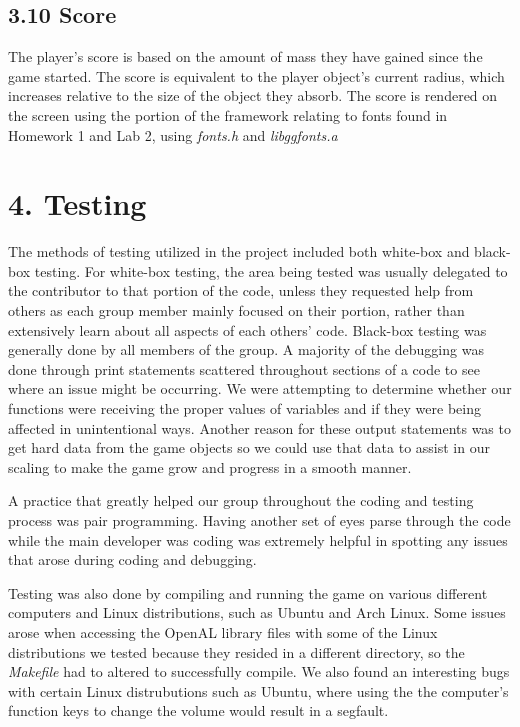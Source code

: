 \documentclass[12pt]{report}
\begin{document}
\newpage
\subsection*{3.10 Score}
The player's score is based on the amount of mass they have gained since the game started. The score is equivalent to the player object's current radius, which increases relative to the size of the object they absorb. The score is rendered on the screen using the portion of the framework relating to fonts found in Homework 1 and Lab 2, using \textit{fonts.h} and \textit{libggfonts.a} \bigskip

\newpage
\section*{4. Testing}

The methods of testing utilized in the project included both white-box and black-box testing. For white-box testing, the area being tested was usually delegated to the contributor to that portion of the code, unless they requested help from others as each group member mainly focused on their portion, rather than extensively learn about all aspects of each others' code. Black-box testing was generally done by all members of the group. A majority of the debugging was done through print statements scattered throughout sections of a code to see where an issue might be occurring. We were attempting to determine whether our functions were receiving the proper values of variables and if they were being affected in unintentional ways. Another reason for these output statements was to get hard data from the game objects so we could use that data to assist in our scaling to make the game grow and progress in a smooth manner. \bigskip

A practice that greatly helped our group throughout the coding and testing process was pair programming. Having another set of eyes parse through the code while the main developer was coding was extremely helpful in spotting any issues that arose during coding and debugging. \bigskip

Testing was also done by compiling and running the game on various different computers and Linux distributions, such as Ubuntu and Arch Linux. Some issues arose when accessing the OpenAL library files with some of the Linux distributions we tested because they resided in a different directory, so the \textit{Makefile} had to altered to successfully compile. We also found an interesting bugs with certain Linux distrubutions such as Ubuntu, where using the the computer's function keys to change the volume would result in a segfault.
\end{document}
